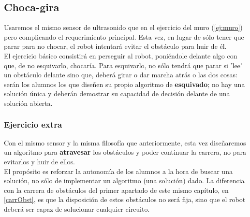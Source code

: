  \subsection{Choca-gira}\label{ej:chocaGira}
 Usaremos el mismo sensor de ultrasonido que en el ejercicio del muro (\ref{ej:muro}) pero complicando el requerimiento principal. Esta vez, en lugar de sólo tener que parar para no chocar, el robot intentará evitar el obstáculo para huir de él. \\
 El ejercicio básico consistirá en perseguir al robot, poniéndole delante algo con que, de no esquivarlo, chocaría. Para esquivarlo, no sólo tendrá que parar si 'lee' un obstáculo delante sino que, deberá girar o dar marcha atrás o las dos cosas: serán los alumnos los que diseñen su propio algoritmo de \textbf{esquivado}; no hay una solución única y deberán demostrar su capacidad de decisión delante de una solución abierta.
\subsubsection{Ejercicio extra}
Con el mismo sensor y la misma filosofía que anteriormente, esta vez diseñaremos un algoritmo para \textbf{atravesar} los obstáculos y poder continuar la carrera, no para evitarlos y huir de ellos. \\
El propósito es reforzar la autonomía de los alumnos a la hora de buscar una solución, no sólo de implementar un algoritmo (una solución) dado. La diferencia con la carrera de obstáculos del primer apartado de este mismo capítulo, en \ref{carrObst}, es que la disposición de estos obstáculos no será fija, sino que el robot deberá ser capaz de solucionar cualquier circuito.
